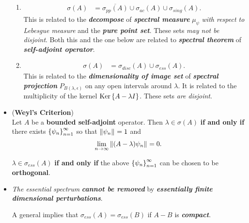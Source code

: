 \documentclass[11pt]{article}
\begin{document}
\begin{itemize}
\begin{remark}
\begin{enumerate}
\item  \begin{align*}
\sigma(A) &= \overline{\sigma_{pp}(A) } \cup \sigma_{ac}(A)  \cup \sigma_{sing}(A).
\end{align*} This is related to the \emph{\textbf{decompose}} of  \emph{\textbf{spectral measure}} $\mu_{\psi}$ \emph{with respect to Lebesgue measure} and the \emph{\textbf{pure point set}}. These sets \emph{may not be disjoint}. Both this and the one below are related to \emph{\textbf{spectral theorem}} of \emph{\textbf{self-adjoint operator}}.

\item \begin{align*}
\sigma(A)&= \sigma_{disc}(A) \cup \sigma_{ess}(A).
\end{align*} This is related to the \emph{\textbf{dimensionality of image set}} of  \emph{\textbf{spectral projection}} $P_{B(\lambda, \epsilon)}$ on any open intervals around $\lambda$. It is related to the multiplicity of the kernel $\text{Ker}\left\{A - \lambda I\right\}$. These sets \emph{are disjoint}. 
\end{enumerate}
\end{remark}


\item \begin{theorem} (\textbf{Weyl's Criterion}) \citep{reed1980methods}\\
Let $A$ be a \textbf{bounded self-adjoint} operator. Then $\lambda \in \sigma(A)$ \textbf{if and only if} there exists $\left\{\psi_n\right\}_{n=1}^{\infty}$ so that $\left\|\psi_n\right\|_{} = 1$ 
and
\begin{align*}
\lim\limits_{n\to \infty}\left\|(A - \lambda)\psi_n\right\|_{} = 0.
\end{align*}

$\lambda \in \sigma_{ess}(A)$ \textbf{if and only if} the above $\left\{\psi_n\right\}_{n=1}^{\infty}$ can be chosen to be \textbf{orthogonal}. 
\end{theorem}

\item \begin{remark}
\emph{The essential spectrum} \emph{\textbf{cannot be removed}} by \emph{\textbf{essentially finite dimensional perturbations}}. 

A general implies that $\sigma_{ess}(A) = \sigma_{ess}(B)$ if $A - B$ is \textbf{\emph{compact}}. 
\end{remark}


\end{itemize}
\end{document}
